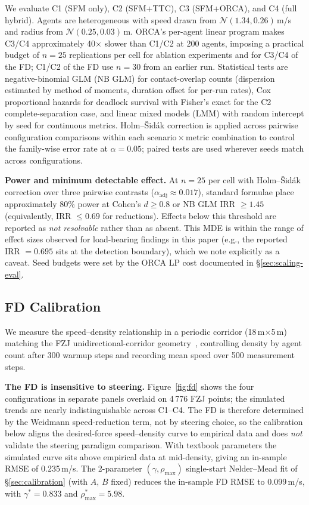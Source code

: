 \documentclass[a4paper,twoside]{article}
\begin{document}
We evaluate C1 (SFM only), C2 (SFM+TTC), C3 (SFM+ORCA), and C4 (full hybrid). Agents are heterogeneous with speed drawn from $\mathcal{N}(1.34,0.26)$\,m/s and radius from $\mathcal{N}(0.25,0.03)$\,m. ORCA's per-agent linear program makes C3/C4 approximately 40$\times$ slower than C1/C2 at 200 agents, imposing a practical budget of $n=25$ replications per cell for ablation experiments and for C3/C4 of the FD; C1/C2 of the FD use $n=30$ from an earlier run. Statistical tests are negative-binomial GLM (NB GLM) for contact-overlap counts (dispersion estimated by method of moments, duration offset for per-run rates), Cox proportional hazards for deadlock survival with Fisher's exact for the C2 complete-separation case, and linear mixed models (LMM) with random intercept by seed for continuous metrics. Holm--\v{S}id\'ak correction is applied across pairwise configuration comparisons within each scenario\,$\times$\,metric combination to control the family-wise error rate at $\alpha=0.05$; paired tests are used wherever seeds match across configurations.

\textbf{Power and minimum detectable effect.}
At $n=25$ per cell with Holm--\v{S}id\'ak correction over three pairwise contrasts ($\alpha_{\text{adj}}\!\approx\!0.017$), standard formulae place approximately 80\% power at Cohen's $d\!\geq\!0.8$ or NB GLM IRR $\geq 1.45$ (equivalently, IRR $\leq 0.69$ for reductions). Effects below this threshold are reported as \emph{not resolvable} rather than as absent. This MDE is within the range of effect sizes observed for load-bearing findings in this paper (e.g., the reported IRR $=0.695$ sits at the detection boundary), which we note explicitly as a caveat. Seed budgets were set by the ORCA LP cost documented in \S\ref{sec:scaling-eval}.

\subsection{FD Calibration}
\label{sec:fd-validation}

We measure the speed--density relationship in a periodic corridor (18\,m$\times$5\,m) matching the FZJ unidirectional-corridor geometry~\cite{FZJ13a}, controlling density by agent count after 300 warmup steps and recording mean speed over 500 measurement steps.

\textbf{The FD is insensitive to steering.}
Figure~\ref{fig:fd} shows the four configurations in separate panels overlaid on 4\,776 FZJ points; the simulated trends are nearly indistinguishable across C1--C4. The FD is therefore determined by the Weidmann speed-reduction term, not by steering choice, so the calibration below aligns the desired-force speed--density curve to empirical data and does \emph{not} validate the steering paradigm comparison. With textbook parameters the simulated curve sits above empirical data at mid-density, giving an in-sample RMSE of 0.235\,m/s. The 2-parameter $(\gamma,\rho_{\max})$ single-start Nelder--Mead fit of \S\ref{sec:calibration} (with $A$, $B$ fixed) reduces the in-sample FD RMSE to 0.099\,m/s, with $\gamma^*=0.833$ and $\rho_{\max}^*=5.98$.
\end{document}

